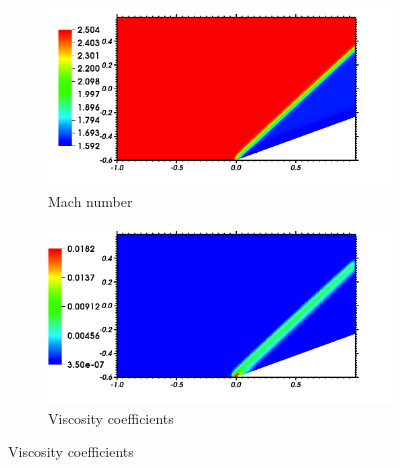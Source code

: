 \documentclass[review,10pt]{elsarticle}
\begin{document}
\begin{figure}[H]
        \centering
        \begin{subfigure}[b]{0.52\textwidth}
                \centering
                \includegraphics[width=\textwidth]{figures/CompressionCorner2D_mach.png}
                \caption{Mach number}
                \label{fig:2d_corner_mach}
        \end{subfigure}%
        \begin{subfigure}[b]{0.52\textwidth}
                \centering
                \includegraphics[width=\textwidth]{figures/CompressionCorner2D_viscosity.png}
                \caption{Viscosity coefficients}
                \label{fig:2d_corner_visc}
        \end{subfigure}
        

\end{figure}
\end{document}
